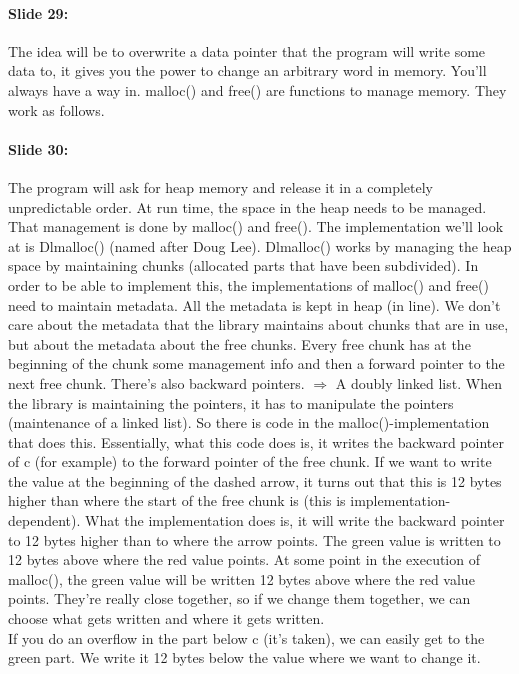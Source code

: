 \documentclass[10pt,a4paper]{report}
\begin{document}
\paragraph{Slide 29:} The idea will be to overwrite a data pointer that the program will write some data to, it gives you the power to change an arbitrary word in memory. You'll always have a way in. malloc() and free() are functions to manage memory. They work as follows.

\paragraph{Slide 30:} The program will ask for heap memory and release it in a completely unpredictable order. At run time, the space in the heap needs to be managed. That management is done by malloc() and free(). The implementation we'll look at is Dlmalloc() (named after Doug Lee). Dlmalloc() works by managing the heap space by maintaining chunks (allocated parts that have been subdivided). In order to be able to implement this, the implementations of malloc() and free() need to maintain metadata. All the metadata is kept in heap (in line). We don't care about the metadata that the library maintains about chunks that are in use, but about the metadata about the free chunks. Every free chunk has at the beginning of the chunk some management info and then a forward pointer to the next free chunk. There's also backward pointers. $\Rightarrow$ A doubly linked list. When the library is maintaining the pointers, it has to manipulate the pointers (maintenance of a linked list). So there is code in the malloc()-implementation that does this. Essentially, what this code does is, it writes the backward pointer of c (for example) to the forward pointer of the free chunk. If we want to write the value at the beginning of the dashed arrow, it turns out that this is 12 bytes higher than where the start of the free chunk is (this is implementation-dependent). What the implementation does is, it will write the backward pointer to 12 bytes higher than to where the arrow points. The green value is written to 12 bytes above where the red value points. At some point in the execution of malloc(), the green value will be written 12 bytes above where the red value points. They're really close together, so if we change them together, we can choose what gets written and where it gets written.\\
If you do an overflow in the part below c (it's taken), we can easily get to the green part. We write it 12 bytes below the value where we want to change it.
\end{document}
